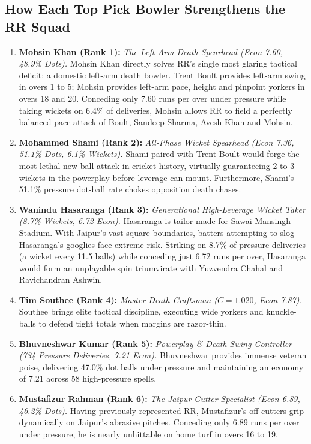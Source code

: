 \documentclass[11pt,a4paper]{article}
\begin{document}
\subsection{How Each Top Pick Bowler Strengthens the RR Squad}
\begin{enumerate}
    \item \textbf{Mohsin Khan (Rank 1):} \textit{The Left-Arm Death Spearhead (Econ 7.60, 48.9\% Dots).} Mohsin Khan directly solves RR's single most glaring tactical deficit: a domestic left-arm death bowler. Trent Boult provides left-arm swing in overs 1 to 5; Mohsin provides left-arm pace, height and pinpoint yorkers in overs 18 and 20. Conceding only 7.60 runs per over under pressure while taking wickets on 6.4\% of deliveries, Mohsin allows RR to field a perfectly balanced pace attack of Boult, Sandeep Sharma, Avesh Khan and Mohsin.
    \item \textbf{Mohammed Shami (Rank 2):} \textit{All-Phase Wicket Spearhead (Econ 7.36, 51.1\% Dots, 6.1\% Wickets).} Shami paired with Trent Boult would forge the most lethal new-ball attack in cricket history, virtually guaranteeing 2 to 3 wickets in the powerplay before leverage can mount. Furthermore, Shami's 51.1\% pressure dot-ball rate chokes opposition death chases.
    \item \textbf{Wanindu Hasaranga (Rank 3):} \textit{Generational High-Leverage Wicket Taker (8.7\% Wickets, 6.72 Econ).} Hasaranga is tailor-made for Sawai Mansingh Stadium. With Jaipur's vast square boundaries, batters attempting to slog Hasaranga's googlies face extreme risk. Striking on 8.7\% of pressure deliveries (a wicket every 11.5 balls) while conceding just 6.72 runs per over, Hasaranga would form an unplayable spin triumvirate with Yuzvendra Chahal and Ravichandran Ashwin.
    \item \textbf{Tim Southee (Rank 4):} \textit{Master Death Craftsman ($C = 1.020$, Econ 7.87).} Southee brings elite tactical discipline, executing wide yorkers and knuckle-balls to defend tight totals when margins are razor-thin.
    \item \textbf{Bhuvneshwar Kumar (Rank 5):} \textit{Powerplay \& Death Swing Controller (734 Pressure Deliveries, 7.21 Econ).} Bhuvneshwar provides immense veteran poise, delivering 47.0\% dot balls under pressure and maintaining an economy of 7.21 across 58 high-pressure spells.
    \item \textbf{Mustafizur Rahman (Rank 6):} \textit{The Jaipur Cutter Specialist (Econ 6.89, 46.2\% Dots).} Having previously represented RR, Mustafizur's off-cutters grip dynamically on Jaipur's abrasive pitches. Conceding only 6.89 runs per over under pressure, he is nearly unhittable on home turf in overs 16 to 19.

\end{enumerate}
\end{document}

